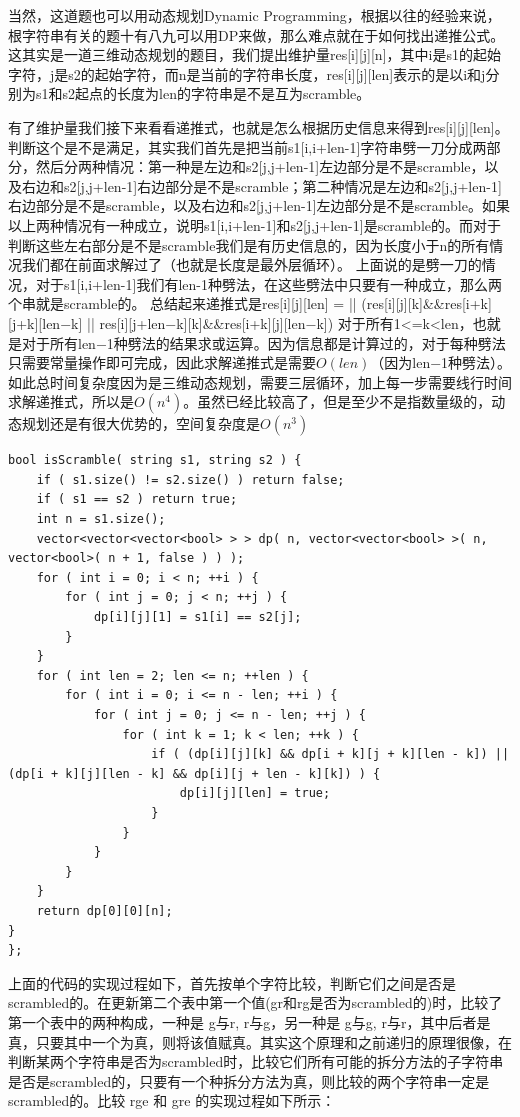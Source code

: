 \documentclass[12pt,a4paper]{article}
\begin{document}
\begin{CJK}{UTF8}{gbsn}
当然，这道题也可以用动态规划Dynamic Programming，根据以往的经验来说，根字符串有关的题十有八九可以用DP来做，那么难点就在于如何找出递推公式。这其实是一道三维动态规划的题目，我们提出维护量res[i][j][n]，其中i是s1的起始字符，j是s2的起始字符，而n是当前的字符串长度，res[i][j][len]表示的是以i和j分别为s1和s2起点的长度为len的字符串是不是互为scramble。
\par
有了维护量我们接下来看看递推式，也就是怎么根据历史信息来得到res[i][j][len]。判断这个是不是满足，其实我们首先是把当前s1[i,i+len-1]字符串劈一刀分成两部分，然后分两种情况：第一种是左边和s2[j,j+len-1]左边部分是不是scramble，以及右边和s2[j,j+len-1]右边部分是不是scramble；第二种情况是左边和s2[j,j+len-1]右边部分是不是scramble，以及右边和s2[j,j+len-1]左边部分是不是scramble。如果以上两种情况有一种成立，说明s1[i,i+len-1]和s2[j,j+len-1]是scramble的。而对于判断这些左右部分是不是scramble我们是有历史信息的，因为长度小于n的所有情况我们都在前面求解过了（也就是长度是最外层循环）。
上面说的是劈一刀的情况，对于s1[i,i+len-1]我们有len-1种劈法，在这些劈法中只要有一种成立，那么两个串就是scramble的。
总结起来递推式是res[i][j][len] = || (res[i][j][k]\&\&res[i+k][j+k][len$-$k] || res[i][j+len$-$k][k]\&\&res[i+k][j][len$-$k]) 对于所有1\textless=k\textless len，也就是对于所有len$-$1种劈法的结果求或运算。因为信息都是计算过的，对于每种劈法只需要常量操作即可完成，因此求解递推式是需要$O(len)$（因为len$-$1种劈法）。
如此总时间复杂度因为是三维动态规划，需要三层循环，加上每一步需要线行时间求解递推式，所以是$O(n^4)$。虽然已经比较高了，但是至少不是指数量级的，动态规划还是有很大优势的，空间复杂度是$O(n^3)$
\end{CJK}
\begin{lstlisting}
bool isScramble( string s1, string s2 ) {
	if ( s1.size() != s2.size() ) return false;
	if ( s1 == s2 ) return true;
	int n = s1.size();
	vector<vector<vector<bool> > > dp( n, vector<vector<bool> >( n, vector<bool>( n + 1, false ) ) );
	for ( int i = 0; i < n; ++i ) {
		for ( int j = 0; j < n; ++j ) {
			dp[i][j][1] = s1[i] == s2[j];
		}
	}
	for ( int len = 2; len <= n; ++len ) {
		for ( int i = 0; i <= n - len; ++i ) {
			for ( int j = 0; j <= n - len; ++j ) {
				for ( int k = 1; k < len; ++k ) {
					if ( (dp[i][j][k] && dp[i + k][j + k][len - k]) || (dp[i + k][j][len - k] && dp[i][j + len - k][k]) ) {
						dp[i][j][len] = true;
					}
				}
			}
		}
	}
	return dp[0][0][n];
}
};
\end{lstlisting}
\begin{CJK}{UTF8}{gbsn}
上面的代码的实现过程如下，首先按单个字符比较，判断它们之间是否是scrambled的。在更新第二个表中第一个值(gr和rg是否为scrambled的)时，比较了第一个表中的两种构成，一种是 g与r, r与g，另一种是 g与g, r与r，其中后者是真，只要其中一个为真，则将该值赋真。其实这个原理和之前递归的原理很像，在判断某两个字符串是否为scrambled时，比较它们所有可能的拆分方法的子字符串是否是scrambled的，只要有一个种拆分方法为真，则比较的两个字符串一定是scrambled的。比较 rge 和 gre 的实现过程如下所示：
\end{CJK}
\end{document}
